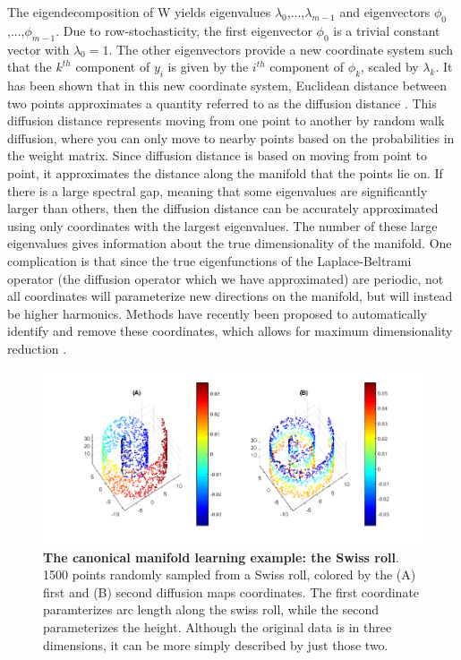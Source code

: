 \documentclass[12pt]{article}
\begin{document}
The eigendecomposition of W yields eigenvalues $\lambda _0$,...,$\lambda_{m-1}$ and eigenvectors $\phi _0$,...,$\phi_{m-1}$. Due to row-stochasticity, the first eigenvector $\phi_0$ is a trivial constant vector with $\lambda_0 = 1$. The other eigenvectors provide a new coordinate system such that the $k^{th}$ component of $y_i$ is given by the $i^{th}$ component of $\phi_k$, scaled by $\lambda_k$. It has been shown that in this new coordinate system, Euclidean distance between two points approximates a quantity referred to as the diffusion distance \cite{Coifman2006}. This diffusion distance represents moving from one point to another by random walk diffusion, where you can only move to nearby points based on the probabilities in the weight matrix. Since diffusion distance is based on moving from point to point, it approximates the distance along the manifold that the points lie on. If there is a large spectral gap, meaning that some eigenvalues are significantly larger than others, then the diffusion distance can be accurately approximated using only coordinates with the largest eigenvalues.  The number of these large eigenvalues gives information about the true dimensionality of the manifold. One complication is that since the true eigenfunctions of the Laplace-Beltrami operator (the diffusion operator which we have approximated) are periodic, not all coordinates will parameterize new directions on the manifold, but will instead be higher harmonics. Methods have recently been proposed to automatically identify and remove these coordinates, which allows for maximum dimensionality reduction \cite{Dsilva2015}.

\begin{figure}[h]
\includegraphics[width=\linewidth]{figures/swissroll}
\caption{\textbf{The canonical manifold learning example: the Swiss roll}. 1500 points randomly sampled from a Swiss roll, colored by the (A) first and (B) second diffusion maps coordinates. The first coordinate paramterizes arc length along the swiss roll, while the second parameterizes the height. Although the original data is in three dimensions, it can be more simply described by just those two.}
\label{fig:sr}
\end{figure}
\end{document}
